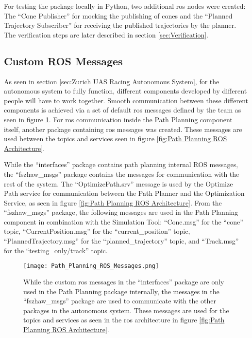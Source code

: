 For testing the package locally in Python, two additional \acrshort{ros} nodes were created: The ``Cone Publisher'' for mocking the publishing of cones and the ``Planned Trajectory Subscriber'' for receiving the published trajectories by the planner. The verification steps are later described in section \ref{sec:Verification}.

\subsection{Custom ROS Messages} \label{sec:Custom ROS Messages}
As seen in section \ref{sec:Zurich UAS Racing Autonomous System}, for the autonomous system to fully function, different components developed by different people will have to work together. Smooth communication between these different components is achieved via a set of default \acrshort{ros} messages defined by the team as seen in figure \ref{fig:Path Planning ROS Messages}. For \acrshort{ros} communication inside the Path Planning component itself, another package containing \acrshort{ros} messages was created. These messages are used between the topics and services seen in figure \ref{fig:Path Planning ROS Architecture}.

While the ``interfaces'' package contains path planning internal ROS messages, the ``fszhaw\_msgs'' package contains the messages for communication with the rest of the system. The ``OptimizePath.srv'' message is used by the Optimize Path service for communication between the Path Planner and the Optimization Service, as seen in figure \ref{fig:Path Planning ROS Architecture}. From the ``fszhaw\_msgs'' package, the following messages are used in the Path Planning component in combination with the Simulation Tool: ``Cone.msg'' for the ``cone'' topic, ``CurrentPosition.msg'' for the ``current\_position'' topic, ``PlannedTrajectory.msg'' for the ``planned\_trajectory'' topic, and ``Track.msg'' for the ``testing\_only/track'' topic.

\begin{figure}[H]
    \centering
    \texttt{[image: Path\_Planning\_ROS\_Messages.png]}
    \caption{While the custom \acrshort{ros} messages in the ``interfaces'' package are only used in the Path Planning package internally, the messages in the ``fszhaw\_msgs'' package are used to communicate with the other packages in the autonomous system. These messages are used for the topics and services as seen in the \acrshort{ros} architecture in figure \ref{fig:Path Planning ROS Architecture}.}
    \label{fig:Path Planning ROS Messages}
\end{figure}

